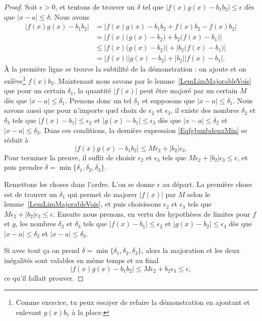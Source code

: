 \begin{proof}
    Soit $\epsilon>0$, et tentons de trouver un $\delta$ tel que $| f(x)g(x)-b_1b_2 |\leq \epsilon$ dès que $| x-a |\leq \delta$. Nous avons
    \begin{equation}    \label{EqfgbunbdeuxMin}
    \begin{split}
    | f(x)g(x)-b_1b_2 |&=|  f(x)g(x)-b_1b_2 +f(x)b_2-f(x)b_2 |\\
            &=\left|   f(x)\big( g(x)-b_2 \big)+b_2\big( f(x)-b_1 \big)    \right|\\
            &\leq \left|  f(x)\big( g(x)-b_2 \big)  \right|+\left|  b_2\big( f(x)-b_1 \big)    \right|\\
            &= | f(x) | | g(x)-b_2  |+| b_2 | |f(x)-b_1 |.
    \end{split}
    \end{equation}
    À la première ligne se trouve la subtilité de la démonstration : on ajoute et on enlève\footnote{Comme exercice, tu peux essayer de refaire la démonstration en ajoutant et enlevant $g(x)b_1$ à la place.} $f(x)b_2$. Maintenant nous savons par le lemme~\ref{LemLimMajorableVois} que pour un certain $\delta_1$, la quantité $| f(x) |$ peut être majoré par un certain $M$ dès que $| x-a |\leq \delta_1$. Prenons donc un tel $\delta_1$ et supposons que $| x-a |\leq \delta_1$. Nous savons aussi que pour n'importe quel choix de $\epsilon_2$ et $\epsilon_3$, il existe des nombres $\delta_2$ et $\delta_3$ tels que $| f(x)-b_1 |\leq \epsilon_2$ et $| g(x)-b_1 |\leq \epsilon_3$ dès que $| x-a |\leq\delta_2$ et $| x-a |\leq\delta_3$. Dans ces conditions, la dernière expression \eqref{EqfgbunbdeuxMin} se réduit à
    \begin{equation}
    | f(x)g(x)-b_1b_2 |\leq M\epsilon_2+| b_2 |\epsilon_3.
    \end{equation}
    Pour terminer la preuve, il suffit de choisir $\epsilon_2$ et $\epsilon_3$ tels que $M\epsilon_2+| b_2 |\epsilon_3\leq\epsilon$, et puis prendre $\delta=\min\{ \delta_1,\delta_2,\delta_3 \}$.

    Remettons les choses dans l'ordre. L'on se donne $\epsilon$ au départ. La première chose est de trouver un $\delta_1$ qui permet de majorer $|f(x)|$ par $M$ selon le lemme~\ref{LemLimMajorableVois}, et puis choisissons $\epsilon_2$ et $\epsilon_3$ tels que $M\epsilon_2+| b_2 |\epsilon_3\leq\epsilon$. Ensuite nous prenons, en vertu des hypothèses de limites pour $f$ et $g$, les nombres $\delta_2$ et $\delta_3$ tels que $| f(x)-b_1 |\leq \epsilon_2$ et $| g(x)-b_2 |\leq \epsilon_3$ dès que $| x-a |\leq \delta_2$ et $| x-a |\leq \delta_3$.

    Si avec tout ça on prend $\delta=\min\{ \delta_1,\delta_2,\delta_3 \}$, alors la majoration et les deux inégalités sont valables en même temps et au final
    \[
      | f(x)g(x)-b_1b_2 |\leq M\epsilon_2+b_2\epsilon_3\leq \epsilon,
    \]
    ce qu'il fallait prouver.

\end{proof}

